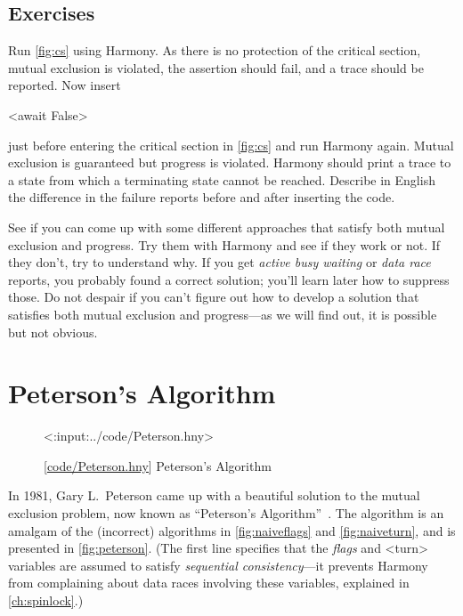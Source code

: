 \documentclass{report}
\newcommand{\harmonylink}[1]{%
[\href{https://harmony.cs.cornell.edu/#1}{\underline{#1}}]%
}
\newenvironment{code}{
\tcolorbox
}{
\endtcolorbox
}
\begin{document}
\section*{Exercises}
\begin{problems}
\item Run \autoref{fig:cs} using Harmony.  As there is no protection of the critical
section, mutual exclusion is violated,
the assertion should fail, and a trace should be reported.
Now insert
\begin{code}
<{await False}>
\end{code}
just before entering the critical section
in \autoref{fig:cs} and run Harmony again.
Mutual exclusion is guaranteed but progress is violated.
Harmony should print a trace
to a state from which a terminating state cannot be reached.
Describe in English the difference in the failure reports before
and after inserting the code.
\item See if you can come up with some different approaches that satisfy both
mutual exclusion and progress.  Try them with Harmony and see if they work or not.
If they don't, try to understand why.
If you get \emph{active busy waiting} or \emph{data race} reports, you probably
found a correct solution; you'll learn later how to suppress those.
Do not despair if you can't figure out how to develop a solution that satisfies both
mutual exclusion and progress---as we will find out, it is possible but not obvious.
\end{problems}

\chapter{Peterson's Algorithm}
\label{ch:peterson}
%

\begin{figure}
\begin{code}
<{:input:../code/Peterson.hny}>
\end{code}
\caption{\harmonylink{code/Peterson.hny} Peterson's Algorithm}
\label{fig:peterson}
\end{figure}

%
In 1981, Gary L.~Peterson came up with a beautiful solution to the mutual exclusion
problem, now known as ``Peterson's Algorithm''~\cite{Peterson81}.
The algorithm is an amalgam of the (incorrect) algorithms in
\autoref{fig:naiveflags} and \autoref{fig:naiveturn}, and is presented
in \autoref{fig:peterson}.
(The first line specifies that the \textit{flags} and <{turn}>
variables are assumed to satisfy \emph{sequential consistency}---it prevents
Harmony from complaining about data races involving these variables,
explained in \autoref{ch:spinlock}.)
\end{document}
